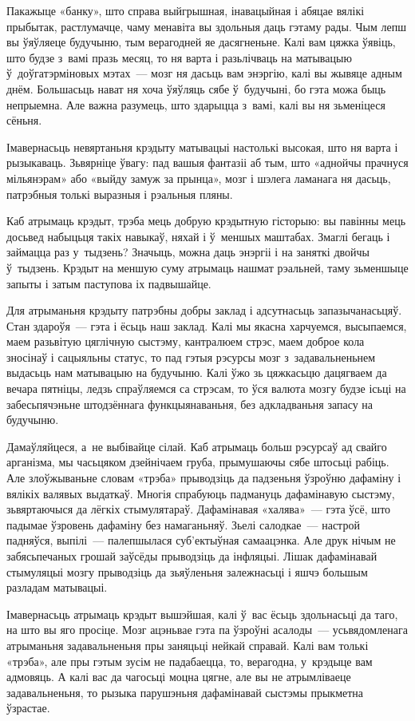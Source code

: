 Пакажыце «банку», што справа выйгрышная, інавацыйная і абяцае вялікі прыбытак, растлумачце, чаму менавіта вы здольныя даць гэтаму рады. Чым лепш вы ўяўляеце будучыню, тым верагодней яе дасягненьне. Калі вам цяжка ўявіць, што будзе з~вамі празь месяц, то ня варта і разьлічваць на матывацыю ў~доўгатэрміновых мэтах~--- мозг ня дасьць вам энэргію, калі вы жывяце адным днём. Большасьць нават ня хоча ўяўляць сябе ў~будучыні, бо гэта можа быць непрыемна. Але важна разумець, што здарыцца з~вамі, калі вы ня зьменіцеся сёньня.

Імавернасьць невяртаньня крэдыту матывацыі настолькі высокая, што ня варта і рызыкаваць. Зьвярніце ўвагу: пад вашыя фантазіі аб тым, што «аднойчы прачнуся мільянэрам» або «выйду замуж за прынца», мозг і шэлега ламанага ня дасьць, патрэбныя толькі выразныя і рэальныя пляны.

Каб атрымаць крэдыт, трэба мець добрую крэдытную гісторыю: вы павінны мець досьвед набыцьця такіх навыкаў, няхай і ў~меншых маштабах. Змаглі бегаць і займацца раз у~тыдзень? Значыць, можна даць энэргіі і на заняткі двойчы ў~тыдзень. Крэдыт на меншую суму атрымаць нашмат рэальней, таму зьменшыце запыты і затым паступова іх падвышайце.

Для атрыманьня крэдыту патрэбны добры заклад і адсутнасьць запазычанасьцяў. Стан здароўя~--- гэта і ёсьць наш заклад. Калі мы якасна харчуемся, высыпаемся, маем разьвітую цяглічную сыстэму, кантралюем стрэс, маем доброе кола зносінаў і сацыяльны статус, то пад гэтыя рэсурсы мозг з~задавальненьнем выдасьць нам матывацыю на будучыню. Калі ўжо зь цяжкасьцю дацягваем да вечара пятніцы, ледзь спраўляемся са стрэсам, то ўся валюта мозгу будзе ісьці на забесьпячэньне штодзённага функцыянаваньня, без адкладваньня запасу на будучыню.

Дамаўляйцеся, а~не выбівайце сілай. Каб атрымаць больш рэсурсаў ад свайго арганізма, мы часьцяком дзейнічаем груба, прымушаючы сябе штосьці рабіць. Але злоўжываньне словам «трэба» прыводзіць да падзеньня ўзроўню дафаміну і вялікіх валявых выдаткаў. Многія спрабуюць падмануць дафамінавую сыстэму, зьвяртаючыся да лёгкіх стымулятараў. Дафамінавая «халява»~--- гэта ўсё, што падымае ўзровень дафаміну без намаганьняў. Зьелі салодкае~--- настрой падняўся, выпілі~--- палепшылася суб'ектыўная самаацэнка. Але друк нічым не забясьпечаных грошай заўсёды прыводзіць да інфляцыі. Лішак дафамінавай стымуляцыі мозгу прыводзіць да зьяўленьня залежнасьці і яшчэ большым разладам матывацыі.

Імавернасьць атрымаць крэдыт вышэйшая, калі ў~вас ёсьць здольнасьці да таго, на што вы яго просіце. Мозг ацэньвае гэта па ўзроўні асалоды~--- усьвядомленага атрыманьня задавальненьня пры заняцьці нейкай справай. Калі вам толькі «трэба», але пры гэтым зусім не падабаецца, то, верагодна, у~крэдыце вам адмовяць. А калі вас да чагосьці моцна цягне, але вы не атрымліваеце задавальненьня, то рызыка парушэньня дафамінавай сыстэмы прыкметна ўзрастае.


